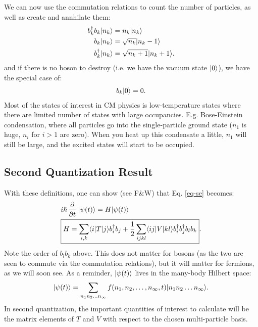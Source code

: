 We can now use the commutation relations to count the number of particles, as well as create and annhilate them:
\begin{equation}
    \begin{split}
        b_k^\dagger b_k \lvert n_k \rangle &= n_k\lvert n_k \rangle
        \\ b_k\lvert n_k \rangle &= \sqrt{n_k}\lvert n_k - 1 \rangle
        \\ b_k^\dagger \lvert n_k \rangle &= \sqrt{n_k + 1}\lvert n_k + 1 \rangle.
    \end{split}
\end{equation}
and if there is no boson to destroy (i.e. we have the vacuum state $\lvert 0 \rangle$), we have the special case of:
\begin{align*}
    b_k\lvert 0 \rangle = 0.
\end{align*}
Most of the states of interest in CM physics is low-temperature states where there are limited number of states with large occupancies. E.g. Bose-Einstein condensation, where all particles go into the single-particle ground state ($n_1$ is huge, $n_i$ for $i > 1$ are zero). When you heat up this condensate a little, $n_1$ will still be large, and the excited states will start to be occupied.

\subsection{Second Quantization Result}
With these definitions, one can show (see F\&W) that Eq. \eqref{eq-se} becomes:
\begin{equation}
    \begin{split}
        &i\hbar \dpd{}{t}\ket{\psi(t)} = H\ket{\psi(t)}
        \\ &\boxed{H = \sum_{i, k}\bra{i}T\ket{j}b_i^\dag b_j + \frac{1}{2}\sum_{ijkl} \bra{ij}V\ket{kl}b_i^\dag b_j^\dag b_l b_k}.
    \end{split}
\end{equation}
Note the order of $b_lb_k$ above. This does not matter for bosons (as the two are seen to commute via the commutation relations), but it will matter for fermions, as we will soon see. As a reminder, $\lvert \psi(t) \rangle$ lives in the many-body Hilbert space:
\begin{align*}
    \lvert \psi(t) \rangle = \sum_{n_1n_2\ldots n_\infty}f(n_1, n_2, \ldots, n_\infty, t)\lvert n_1n_2\ldots n_\infty \rangle.
\end{align*}
In second quantization, the important quantities of interest to calculate will be the matrix elements of $T$ and $V$ with respect to the chosen multi-particle basis.

